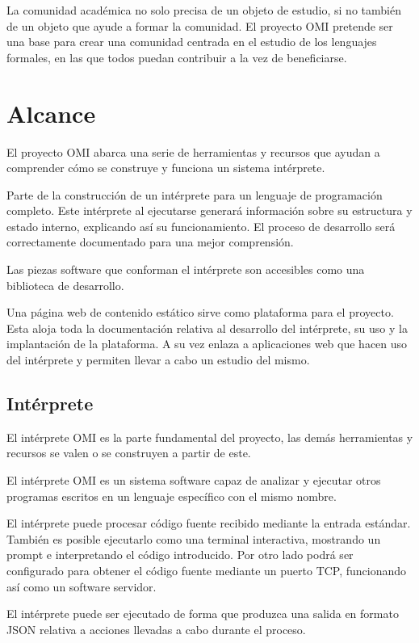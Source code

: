 La comunidad académica no solo precisa de un objeto de estudio, si no también de un objeto que ayude a formar la comunidad. El proyecto OMI pretende ser una base para crear una comunidad 
centrada en el estudio de los lenguajes formales, en las que todos puedan contribuir a la vez de beneficiarse.

\section{Alcance} 

El proyecto OMI abarca una serie de herramientas y recursos que ayudan a comprender 
cómo se construye y funciona un sistema intérprete.

Parte de la construcción de un intérprete para un lenguaje de programación completo. Este intérprete  
al ejecutarse generará información sobre su estructura y estado interno, explicando así su funcionamiento. 
El proceso de desarrollo será correctamente documentado para una mejor comprensión.

Las piezas software que conforman el intérprete son accesibles como una biblioteca de desarrollo.

Una página web de contenido estático sirve como plataforma para el proyecto. Esta
aloja toda la documentación relativa al desarrollo del intérprete, su uso y la implantación de la plataforma.
A su vez enlaza a aplicaciones web que hacen uso del intérprete y permiten llevar a 
cabo un estudio del mismo.

\subsection{Intérprete}
El intérprete OMI es la parte fundamental del proyecto, las demás herramientas y recursos se valen o se construyen a partir de este. 

El intérprete OMI es un sistema software capaz de analizar y ejecutar otros programas escritos en un lenguaje específico con el mismo nombre.

El intérprete puede procesar código fuente recibido mediante la entrada estándar. También es posible ejecutarlo como una terminal interactiva, mostrando un prompt
e interpretando el código introducido. Por otro lado podrá ser configurado para obtener el código fuente mediante un puerto TCP, funcionando así como un software 
servidor. 

El intérprete puede ser ejecutado de forma que produzca una salida en formato JSON relativa a acciones llevadas a cabo durante el proceso.

